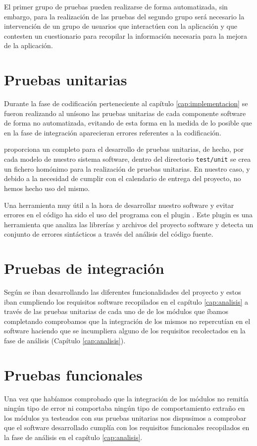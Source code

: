 El primer grupo de pruebas pueden realizarse de forma automatizada, sin embargo,
para la realización de las pruebas del segundo grupo será necesario la
intervención de un grupo de usuarios que interactúen con la aplicación y que
contesten un cuestionario para recopilar la información necesaria para la mejora
de la aplicación.

\section{Pruebas unitarias}
Durante la fase de codificación perteneciente al capítulo
\ref{cap:implementacion} se fueron realizando al unísono las pruebas unitarias
de cada componente software de forma no automatizada, evitando de esta forma en
la medida de lo posible que en la fase de integración aparecieran errores
referentes a la codificación.

 proporciona un completo  para el
desarrollo de pruebas unitarias, de hecho, por cada modelo de nuestro sistema
software, dentro del directorio \texttt{test/unit} se crea un fichero homónimo
para la realización de pruebas unitarias. En nuestro caso, y debido a la
necesidad de cumplir con el calendario de entrega del proyecto, no hemos hecho
uso del mismo.

Una herramienta muy útil a la hora de desarrollar nuestro software y evitar
errores en el código ha sido el uso del programa  con el
plugin . Este plugin es una herramienta que analiza las
librerías y archivos del proyecto software y detecta un conjunto de errores
sintácticos a través del análisis del código fuente.

\section{Pruebas de integración}
Según se iban desarrollando las diferentes funcionalidades del proyecto y estos
iban cumpliendo los requisitos software recopilados en el capítulo
\ref{cap:analisis} a través de las pruebas unitarias de cada uno de de los
módulos que íbamos completando comprobamos que la integración de los mismos no
repercutían en el software haciendo que se incumpliera alguno de los requisitos
recolectados en la fase de análisis (Capítulo \ref{cap:analisis}).


\section{Pruebas funcionales}
Una vez que habíamos comprobado que la integración de los módulos no remitía
ningún tipo de error ni comportaba ningún tipo de comportamiento extraño en los
módulos ya testeados con sus pruebas unitarias nos dispusimos a comprobar que el
software desarrollado cumplía con los requisitos funcionales recopilados en la
fase de análisis en el capítulo \ref{cap:analisis}.

